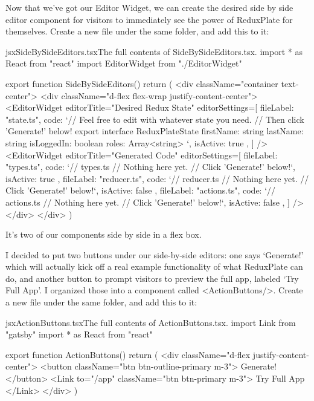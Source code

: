 \documentclass[a4paper,headinclude=on,footinclude=on,12pt,oneside]{scrbook}
\begin{document}
Now that we've got our Editor Widget, we can create the desired side by side editor component for visitors to immediately see the power of ReduxPlate for themselves. Create a new file  under the same  folder, and add this to it:

\begin{codeInput}{jsx}{SideBySideEditors.tsx}{The full contents of SideBySideEditors.tsx.}
import * as React from "react"
import { EditorWidget } from "./EditorWidget"

export function SideBySideEditors() {
  return (
    <div className="container text-center">
      <div className="d-flex flex-wrap justify-content-center">
        <EditorWidget
          editorTitle="Desired Redux State"
          editorSettings={[
            {
              fileLabel: "state.ts",
              code: `// Feel free to edit with whatever state you need.
// Then click 'Generate!' below!
export interface ReduxPlateState {
  firstName: string
  lastName: string
  isLoggedIn: boolean
  roles: Array<string>
}`,
isActive: true
            },
          ]}
        />
        <EditorWidget
          editorTitle="Generated Code"
          editorSettings={[
            {
              fileLabel: "types.ts",
              code: `// types.ts
// Nothing here yet.
// Click 'Generate!' below!`,
isActive: true
            },
            {
              fileLabel: "reducer.ts",
              code: `// reducer.ts
// Nothing here yet.
// Click 'Generate!' below!`,
isActive: false
            },
            {
              fileLabel: "actions.ts",
              code: `// actions.ts
// Nothing here yet.
// Click 'Generate!' below!`,
isActive: false
            },
          ]}
        />
      </div>
    </div>
  )
}
\end{codeInput}

It's two of our  components side by side in a flex box. 


I decided to put two buttons under our side-by-side editors: one says `Generate!' which will actually kick off a real example functionality of what ReduxPlate can do, and another button to prompt visitors to preview the full app, labeled `Try Full App'. I organized those into a component called <ActionButtons/>. Create a new file  under the same  folder, and add this to it:

\begin{codeInput}{jsx}{ActionButtons.tsx}{The full contents of ActionButtons.tsx.}
import { Link } from "gatsby"
import * as React from "react"

export function ActionButtons() {
  return (
    <div className="d-flex justify-content-center">
      <button className="btn btn-outline-primary m-3">
        Generate!
      </button>
      <Link to="/app" className="btn btn-primary m-3">
        Try Full App
      </Link>
    </div>
  )
}  
\end{codeInput}
\end{document}
